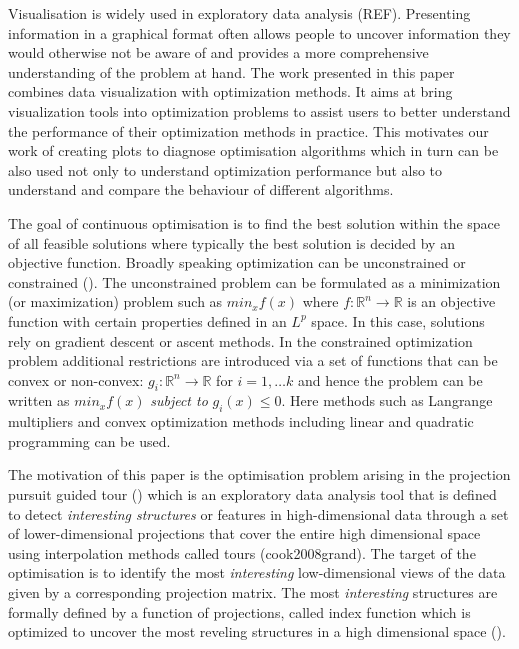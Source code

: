 \documentclass[12pt]{article}
\begin{document}
Visualisation is widely used in exploratory data analysis (REF). Presenting information in a graphical format often allows people to uncover information they would otherwise not be aware of and provides a more comprehensive understanding of the problem at hand. The work presented in this paper combines data visualization with optimization methods. It aims at bring visualization tools into optimization problems to assist users to better understand the performance of their optimization methods in practice. This motivates our work of creating plots to diagnose optimisation algorithms which in turn can be also used not only to understand optimization performance but also to understand and compare the behaviour of different algorithms.

The goal of continuous optimisation is to find the best solution within the space of all feasible solutions where typically the best solution is decided by an objective function. Broadly speaking optimization can be unconstrained or constrained (\citet{kelley1999iterative}). The unconstrained problem can be formulated as a minimization (or maximization) problem such as
\(min_{x} f(x)\) where \(f:\mathbb{R}^n \rightarrow \mathbb{R}\) is an objective function with certain properties defined in an \(L^p\) space. In this case, solutions rely on gradient descent or ascent methods. In the constrained optimization problem additional restrictions are introduced via a set of functions that can be convex or non-convex: \(g_i:\mathbb{R}^n \rightarrow \mathbb{R}\) for \(i = 1, \ldots k\) and hence the problem can be written as
\(min_{x} f(x)\) \emph{subject to} \(g_i(x) \leq 0\). Here methods such as Langrange multipliers and convex optimization methods including linear and quadratic programming can be used.

The motivation of this paper is the optimisation problem arising in the projection pursuit guided tour (\citet{buja2005computational}) which is an exploratory data analysis tool that is defined to detect \emph{interesting structures} or features in high-dimensional data through a set of lower-dimensional projections that cover the entire high dimensional space using interpolation methods called tours (cook2008grand). The target of the optimisation is to identify the most \emph{interesting} low-dimensional views of the data given by a corresponding projection matrix. The most \emph{interesting} structures are formally defined by a function of projections, called index function which is optimized to uncover the most reveling structures in a high dimensional space (\citet{cook1993projection}).
\end{document}
